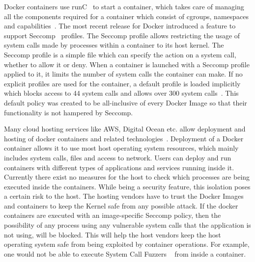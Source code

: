 Docker containers use runC~\cite{solomonhykes2015} to start a container, which takes care of managing all the components required for a container which consist of  cgroups, namespaces and capabilities~\cite{dockersec1}. The most recent release for Docker introduced a feature to support Seccomp~\cite{seccomp} profiles. The Seccomp profile allows restricting the usage of system calls made by processes within a container to its host kernel. The Seccomp profile is a simple file which can specify the action on a system call, whether to allow it or deny. When a container is launched with a Seccomp profile applied to it, it limits the number of system calls the container can make. If no explicit profiles are used for the container, a default profile is loaded implicitly which blocks access to 44 system calls and allows over 300 system calls~\cite{seccomp}. This default policy was created to be all-inclusive of every Docker Image so that their functionality is not hampered by Seccomp.

Many cloud hosting services like AWS, Digital Ocean etc. allow deployment and hosting of docker containers and related technologies~\cite{awsdigitalocean}. Deployment of a Docker container allows it to use most host operating system resources, which mainly includes system calls, files and access to network. Users can deploy and run containers with different types of applications and services running inside it. Currently there exist no measures for the host to check which processes are being executed inside the containers. While being a security feature, this isolation poses a certain risk to the host. The hosting vendors have to trust the Docker Images and containers to keep the Kernel safe from any possible attack. If the docker containers are executed with an image-specific Seccomp policy, then the possibility of any process using any vulnerable system calls that the application is not using, will be blocked. This will help the host vendors keep the host operating system safe from being exploited by container operations. For example, one would not be able to execute System Call Fuzzers ~\cite{kernelsyscallfuzzer} from inside a container.

